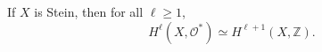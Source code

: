If $X$ is Stein, then for all $\ell \geqslant 1$,
$$H^\ell(X, \mathcal{O}^*) \simeq H^{\ell+1}(X, \mathbb{Z}).$$

